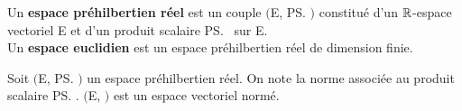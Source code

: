 \vspace{1cm}

Un \textbf{espace préhilbertien réel} est un couple $\bigl($E, \ps$\bigr)$ constitué d'un \(\mathbb{R}\)-espace vectoriel E et d'un produit scalaire \ps \ sur E.\\
Un \textbf{espace euclidien} est un espace préhilbertien réel de dimension finie.

\vspace{1cm}

\noindent Soit $\bigl($E, \ps$\bigr)$ un espace préhilbertien réel. On note \normtxt{\ } la norme associée au produit\vspace{0.1cm}\\
scalaire \ps. $\bigl($E, \normtxt{\ }$\bigr)$ est un espace vectoriel normé.\vspace{0.2cm}
